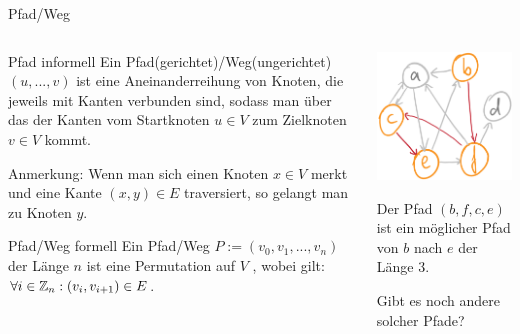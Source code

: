 \documentclass[handout]{beamer}
\begin{document}
\begin{frame}{Pfad/Weg}
	\begin{columns}
		\begin{column}{0.6\textwidth}
			\begin{block}{Pfad informell}
				Ein Pfad(gerichtet)/Weg(ungerichtet) $(u,...,v)$ ist eine Aneinanderreihung von Knoten, die jeweils mit Kanten verbunden sind, sodass man über das  der Kanten vom Startknoten $u\in V$ zum Zielknoten $v\in V$ kommt.
			\end{block}
			
			\bp
			Anmerkung: Wenn man sich einen Knoten $x \in V$ merkt und eine Kante $(x,y) \in E$ traversiert, so gelangt man zu Knoten $y$.
			\bp
			
			\begin{block}{Pfad/Weg formell}
				Ein Pfad/Weg $P := (v_0, v_1, ..., v_n)$ der Länge $n$ ist eine Permutation auf $V$ , wobei gilt: $\forall i \in \mathbb{Z}_n: (v_i, v_{i+1}) \in E$.
			\end{block}	
		\end{column}
		
		\begin{column}{0.4\textwidth}
			\bp
			\includegraphics[scale=0.3]{images/graph_pfad.png}
			
			\ip Der Pfad $(b,f,c,e)$ ist ein möglicher Pfad von $b$ nach $e$ der Länge 3.
			
			\ip Gibt es noch andere solcher Pfade?
		\end{column}
	\end{columns}
\end{frame}
\end{document}
